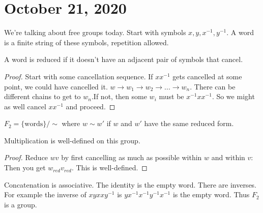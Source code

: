 \documentclass{article}
\newcommand{\ra}[1][]{\xrightarrow{#1}}
\begin{document}
\section{October 21, 2020}
We're talking about free groups today. Start with symbols $x,y,x^{-1},y^{-1}$. A word is a finite string of these symbols, repetition allowed. 
\begin{definition}
A word is reduced if it doesn't have an adjacent pair of symbols that cancel.
\end{definition}
\begin{proof}
Start with some cancellation sequence. If $xx^{-1}$ gets cancelled at some point, we could have cancelled it. $w\ra w_1\ra w_2\ra...\ra w_n$. There can be different chains to get to $w_n$.If not, then some $w_i$ must be $x^{-1}xx^{-1}$. So we might as well cancel $xx^{-1}$ and proceed.
\end{proof}
\begin{definition}
$F_2=\{\textrm{words}\}/\sim$ where $w\sim w'$ if $w$ and $w'$ have the same reduced form. 
\end{definition}
Multiplication is well-defined on this group.
\begin{proof}
Reduce $wv$ by first cancelling as much as possible within $w$ and within $v$: Then you get $w_{red}v_{red}$. This is well-defined.
\end{proof}
Concatenation is associative. The identity is the empty word. There are inverses. For example the inverse of $xyxxy^{-1}$ is $yx^{-1}x^{-1}y^{-1}x^{-1}$ is the empty word. Thus $F_2$ is a group.
\end{document}
